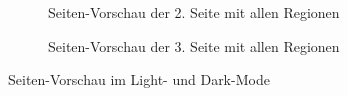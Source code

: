 \documentclass[notables, nomenclature, oneside, 150]{HSMW-Thesis}
\begin{document}
\begin{figure}[h]
\begin{subfigure}[t]{0.3\textwidth}
        	\caption{Seiten-Vorschau der 2. Seite mit allen Regionen}
        	\label{fig:v11}
    	\end{subfigure}
    	\begin{subfigure}[t]{0.3\textwidth}
        	\caption{Seiten-Vorschau der 3. Seite mit allen Regionen}
        	\label{fig:v12}
    	\end{subfigure}
    	
    	\caption{Seiten-Vorschau im Light- und Dark-Mode}
		\label{fig:zusatz3}
	\end{figure}
	
\end{document}
